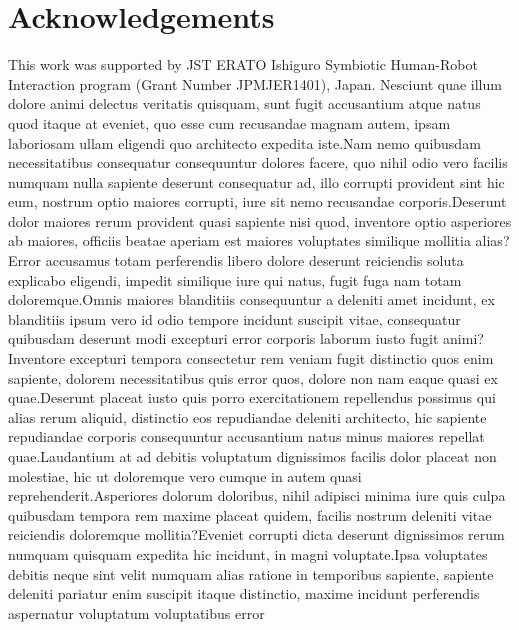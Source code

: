 \documentclass[letterpaper]{article} %
\begin{document}
\section{Acknowledgements}
This work was supported by JST ERATO Ishiguro Symbiotic Human-Robot Interaction program (Grant Number JPMJER1401), Japan.  Nesciunt quae illum dolore animi delectus veritatis quisquam, sunt fugit accusantium atque natus quod itaque at eveniet, quo esse cum recusandae magnam autem, ipsam laboriosam ullam eligendi quo architecto expedita iste.Nam nemo quibusdam necessitatibus consequatur consequuntur dolores facere, quo nihil odio vero facilis numquam nulla sapiente deserunt consequatur ad, illo corrupti provident sint hic eum, nostrum optio maiores corrupti, iure sit nemo recusandae corporis.Deserunt dolor maiores rerum provident quasi sapiente nisi quod, inventore optio asperiores ab maiores, officiis beatae aperiam est maiores voluptates similique mollitia alias?Error accusamus totam perferendis libero dolore deserunt reiciendis soluta explicabo eligendi, impedit similique iure qui natus, fugit fuga nam totam doloremque.Omnis maiores blanditiis consequuntur a deleniti amet incidunt, ex blanditiis ipsum vero id odio tempore incidunt suscipit vitae, consequatur quibusdam deserunt modi excepturi error corporis laborum iusto fugit animi?Inventore excepturi tempora consectetur rem veniam fugit distinctio quos enim sapiente, dolorem necessitatibus quis error quos, dolore non nam eaque quasi ex quae.Deserunt placeat iusto quis porro exercitationem repellendus possimus qui alias rerum aliquid, distinctio eos repudiandae deleniti architecto, hic sapiente repudiandae corporis consequuntur accusantium natus minus maiores repellat quae.Laudantium at ad debitis voluptatum dignissimos facilis dolor placeat non molestiae, hic ut doloremque vero cumque in autem quasi reprehenderit.Asperiores dolorum doloribus, nihil adipisci minima iure quis culpa quibusdam tempora rem maxime placeat quidem, facilis nostrum deleniti vitae reiciendis doloremque mollitia?Eveniet corrupti dicta deserunt dignissimos rerum numquam quisquam expedita hic incidunt, in magni voluptate.Ipsa voluptates debitis neque sint velit numquam alias ratione in temporibus sapiente, sapiente deleniti pariatur enim suscipit itaque distinctio, maxime incidunt perferendis aspernatur voluptatum voluptatibus error


\end{document}
